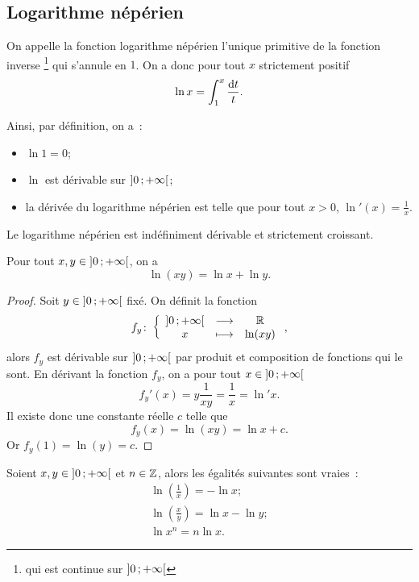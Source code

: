 \subsection{Logarithme népérien}
\label{subsec:chap1-lognep}
%
\begin{defdef}
\label{def:chap1-deflognep}
On appelle la fonction logarithme népérien l'unique primitive de la fonction inverse \footnote{qui est continue sur \(\left] 0 \, ;  +\infty \right[\)} qui s'annule en \(1\). On a donc pour tout \(x\) strictement positif
\begin{equation}
  \ln x=\int_{1}^{x} \frac{\mathop{}\mathopen{}\mathrm{d} t}{t}.
\end{equation}
\end{defdef}
%
Ainsi, par définition, on a~:
\begin{itemize}
\item \(\ln 1 = 0\);
\item \(\ln\) est dérivable sur \(\left] 0 \, ;  +\infty \right[\);
\item la dérivée du logarithme népérien est telle que pour tout \(x>0\), \(\ln'(x)=\frac{1}{x}\).
\end{itemize}
Le logarithme népérien est indéfiniment dérivable et strictement croissant.
%
\begin{theo}
\label{theo:lognep1}
  Pour tout \(x, y \in \left] 0 \, ;  +\infty \right[\), on a
  \begin{equation}
    \ln(xy)=\ln x + \ln y.
  \end{equation}
\end{theo}
\begin{proof}
  Soit \(y \in \left] 0 \, ;  +\infty \right[\) fixé. On définit la fonction
  \begin{equation}
    f_y\colon \left\{\begin{array}{ccc} \left] 0 \, ;  +\infty \right[ & \longrightarrow &\mathbb{R}\\ x & \longmapsto & \ln(xy) \end{array} \right.,
  \end{equation}
  alors \(f_y\) est dérivable sur \(\left] 0 \, ;  +\infty \right[\) par produit et composition de fonctions qui le sont. En dérivant la fonction \(f_y\), on a pour tout \(x \in \left] 0 \, ;  +\infty \right[\)
   \begin{equation}
     f_y'(x)=y \frac{1}{xy}=\frac{1}{x}=\ln' x.
   \end{equation}
  Il existe donc une constante réelle \(c\) telle que
  \begin{equation}
    f_y(x)=\ln(xy)=\ln x + c.
  \end{equation}
  Or \(f_y(1)=\ln(y)=c\).
\end{proof}
%
\begin{prop}
  Soient \(x, y \in \left] 0 \, ;  +\infty \right[\) et \(n \in \mathbb{Z}\), alors les égalités suivantes sont vraies~:
  \begin{gather}
    \ln \left(\frac{1}{x}\right)=-\ln x;\\
    \ln \left(\frac{x}{y}\right)=\ln x - \ln y; \\
    \ln x^n=n\ln x.
  \end{gather}
\end{prop}
